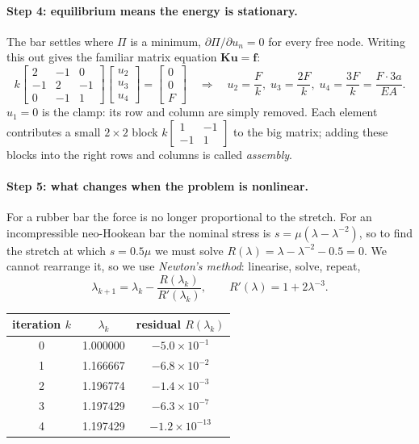 \documentclass[11pt,a4paper]{article}
\numberwithin{equation}{section}
\newcommand{\F}{\mathbf{F}}
\newcommand{\uu}{\mathbf{u}}
\newcommand{\K}{\mathbf{K}}
\begin{document}
\paragraph{Step 4: equilibrium means the energy is stationary.}
The bar settles where $\Pi$ is a minimum, $\partial\Pi/\partial u_n=0$ for every free
node. Writing this out gives the familiar matrix equation $\K\uu=\mathbf{f}$:
\begin{equation}
k\begin{bmatrix}2&-1&0\\-1&2&-1\\0&-1&1\end{bmatrix}
\begin{bmatrix}u_2\\u_3\\u_4\end{bmatrix}=\begin{bmatrix}0\\0\\F\end{bmatrix}
\quad\Longrightarrow\quad u_2=\frac{F}{k},\;u_3=\frac{2F}{k},\;u_4=\frac{3F}{k}=\frac{F\cdot 3a}{EA}.
\end{equation}
$u_1=0$ is the clamp: its row and column are simply removed. Each element contributes
a small $2\times2$ block $k\left[\begin{smallmatrix}1&-1\\-1&1\end{smallmatrix}\right]$
to the big matrix; adding these blocks into the right rows and columns is called
\emph{assembly}.

\paragraph{Step 5: what changes when the problem is nonlinear.}
For a rubber bar the force is no longer proportional to the stretch. For an
incompressible neo-Hookean bar the nominal stress is $s=\mu(\lambda-\lambda^{-2})$,
so to find the stretch at which $s=0.5\mu$ we must solve
$R(\lambda)=\lambda-\lambda^{-2}-0.5=0$. We cannot rearrange it, so we use
\emph{Newton's method}: linearise, solve, repeat,
\begin{equation}
\lambda_{k+1}=\lambda_k-\frac{R(\lambda_k)}{R'(\lambda_k)},\qquad R'(\lambda)=1+2\lambda^{-3}.
\end{equation}

\begin{center}
\begin{tabular}{ccc}
\toprule
iteration $k$ & $\lambda_k$ & residual $R(\lambda_k)$\\
\midrule
0 & 1.000000 & $-5.0\times10^{-1}$\\
1 & 1.166667 & $-6.8\times10^{-2}$\\
2 & 1.196774 & $-1.4\times10^{-3}$\\
3 & 1.197429 & $-6.3\times10^{-7}$\\
4 & 1.197429 & $-1.2\times10^{-13}$\\
\bottomrule
\end{tabular}
\end{center}
\end{document}
